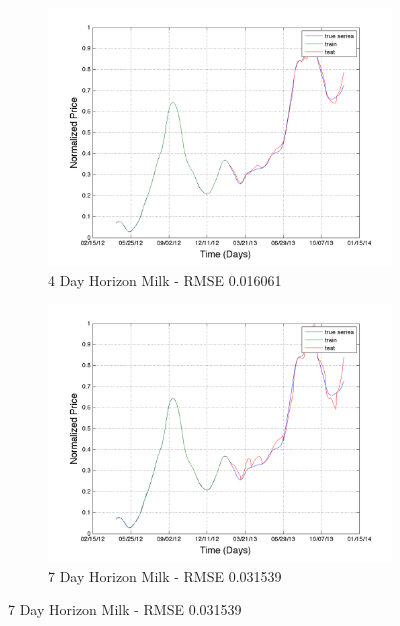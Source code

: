 \begin{figure}
        \centering
        \begin{subfigure}[b]{0.5\textwidth}
                \includegraphics[width=\textwidth]{img/model/milk/model3_3/pred_4}
                \caption{4 Day Horizon Milk - RMSE 0.016061}
                \label{fig:gull}
        \end{subfigure}%
           \begin{subfigure}[b]{0.5\textwidth}
                \includegraphics[width=\textwidth]{img/model/milk/model3_3/pred_7}
                \caption{7 Day Horizon Milk - RMSE 0.031539}
                \label{fig:gull}
        \end{subfigure}%
              \hfill    

\end{figure}
